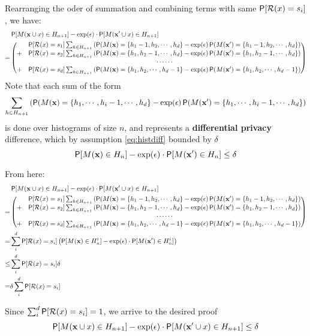 \documentclass[11pt]{article}
\newcommand{\cR}{\mathcal{R}}
\newcommand{\xv}{\mathbf{x}}
\begin{document}
\begin{prop}
Rearranging the oder of summation and combining terms with same $ \P[\cR(x) = s_i]$, we have:
 \begin{align*}
& \P[M(\xv \cup x) \in H_{n+1}] - \exp(\epsilon) \cdot \P[M(\xv' \cup x) \in H_{n+1}]  \\
= & \begin{pmatrix} 
& \P[\cR(x) = s_1] \sum_{h \in H_{n+1}}  \left (   \P(M(\xv) = \{h_1 -1 , h_2, \cdots, h_d \}  -  \exp(\epsilon)\P(M(\xv') = \{h_1 - 1, h_2,  \cdots, h_d \}   \right) \\
+ & \P[\cR(x) = s_2] \sum_{h \in H_{n+1}}  \left (   \P(M(\xv) = \{h_1, h_2 - 1, \cdots, h_d \}  -  \exp(\epsilon)\P(M(\xv') = \{h_1,  h_2 - 1, \cdots, h_d \}   \right) \\
& \cdots \cdots \\
+  & \P[\cR(x) = s_d] \sum_{h \in H_{n+1}}  \left (   \P(M(\xv) = \{h_1, h_2, \cdots, h_d -1 \}  -  \exp(\epsilon)\P(M(\xv') = \{h_1, h_2,  \cdots, h_d -1 \}   \right) 
\end{pmatrix}
 \end{align*}
Note that each sum of the form  
\[ \sum_{h \in H_{n+1}}  \left (   \P(M(\xv) = \{h_1, \cdots, h_i-1, \cdots, h_d \}  -  \exp(\epsilon)\P(M(\xv') = \{h_1,  \cdots, h_i-1, \cdots, h_d \}   \right) \]
is done over histograms of size $n$, and represents a \textbf{differential privacy} difference, which by assumption  \eqref{eq:histdiff} bounded by $\delta$
\[ \P[M(\xv) \in H_n] - \exp(\epsilon) \cdot \P[M(\xv') \in H_n] \le \delta \]

From here:
 \begin{align*}
& \P[M(\xv \cup x) \in H_{n+1}] - \exp(\epsilon) \cdot \P[M(\xv' \cup x) \in H_{n+1}]  \\
= & \begin{pmatrix} 
& \P[\cR(x) = s_1] \sum_{h \in H_{n+1}}  \left (   \P(M(\xv) = \{h_1 -1 , h_2, \cdots, h_d \}  -  \exp(\epsilon)\P(M(\xv') = \{h_1 - 1, h_2,  \cdots, h_d \}   \right) \\
+ & \P[\cR(x) = s_2] \sum_{h \in H_{n+1}}  \left (   \P(M(\xv) = \{h_1, h_2 - 1, \cdots, h_d \}  -  \exp(\epsilon)\P(M(\xv') = \{h_1,  h_2 - 1, \cdots, h_d \}   \right) \\
& \cdots \cdots \\
+  & \P[\cR(x) = s_d] \sum_{h \in H_{n+1}}  \left (   \P(M(\xv) = \{h_1, h_2, \cdots, h_d -1 \}  -  \exp(\epsilon)\P(M(\xv') = \{h_1, h_2,  \cdots, h_d -1 \}   \right) 
\end{pmatrix} \\
= & \sum^d_i  \P[\cR(x) = s_i] \left (   \P[M(\xv) \in H^i_n] - \exp(\epsilon) \cdot \P[M(\xv') \in H^i_n] \right ) \\
\le &  \sum^d_i  \P[\cR(x) = s_i]  \delta \\
= & \delta \sum^d_i  \P[\cR(x) = s_i]  
 \end{align*}
 
 Since $ \sum^d_i  \P[\cR(x) = s_i] =1$, we arrive to the desired proof
 \[  \P[M(\xv \cup x) \in H_{n+1}] - \exp(\epsilon) \cdot \P[M(\xv' \cup x) \in H_{n+1}]   \le \delta \]

\end{prop}
\end{document}
